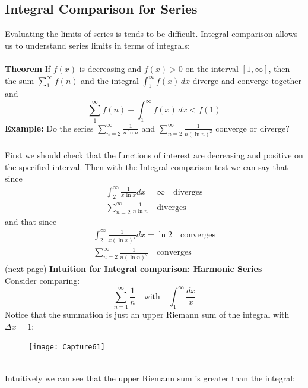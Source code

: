 \documentclass{report}
\begin{document}
\subsection{Integral Comparison for Series} %
Evaluating the limits of series is tends to be difficult. Integral comparison allows us
to understand series limits in terms of integrals:\\
\vspace{1mm}\\
\textbf{Theorem} If $f(x)$ is decreasing and $f(x)>0$ on the interval $[1,\infty]$, then
the sum $\sum^\infty_1f(n)$ and the integral $\int_1^\infty f(x)\,dx$ diverge and converge together and
\begin{equation*}
\sum^\infty_1f(n)-\int_1^\infty f(x)\,dx<f(1)
\end{equation*}
\textbf{Example:} Do the series $\sum^\infty_{n=2}\frac{1}{n\ln n}$ and 
$\sum^\infty_{n=2}\frac{1}{n(\ln n)^2}$ converge or diverge?\\
\vspace{1mm}\\
First we should check that the functions of interest are decreasing and positive on the specified interval. 
Then with the Integral comparison test we can say that since
\begin{align*}
\int_2^\infty\frac{1}{x\ln x}dx=\infty\quad\text{diverges}\\
\sum^\infty_{n=2}\frac{1}{n\ln n}\quad\text{diverges}
\end{align*}
and that since
\begin{align*}
\int_2^\infty\frac{1}{x(\ln x)^2}dx=\ln2\quad\text{converges}\\
\sum^\infty_{n=2}\frac{1}{n(\ln n)^2}\quad\text{converges}
\end{align*}
(next page)
\newpage
\noindent\textbf{Intuition for Integral comparison: Harmonic Series}\\
Consider comparing:
\begin{equation*}
\sum^\infty_{n=1}\frac{1}{n}\quad\text{with}\quad\int_1^\infty\frac{dx}{x}
\end{equation*}
Notice that the summation is just an upper Riemann sum of the integral with $\Delta x=1$:
\begin{figure}[h]
\texttt{[image: Capture61]}\\
\centering
{}
\end{figure}\\
Intuitively we can see that the upper Riemann sum is greater than the integral:
\end{document}
